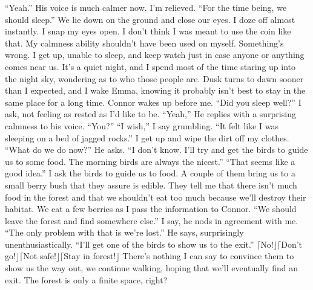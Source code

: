 \documentclass[openany, 12pt]{book}
\newcommand\bird[1]{$\lceil$#1$\rfloor$\tab}
\newcommand\tab[1][1cm]{\hspace*{#1}}
\begin{document}
\newline
\tab
``Yeah.'' His voice is much calmer now. I’m relieved. ``For the time being, we should sleep.'' We lie down on the ground and close our eyes. I doze off almost instantly.
\newline
\newline
\tab
I snap my eyes open. I don’t think I was meant to use the coin like that. My calmness ability shouldn’t have been used on myself. Something’s wrong. I get up, unable to sleep, and keep watch just in case anyone or anything comes near us. It’s a quiet night, and I spend most of the time staring up into the night sky, wondering as to who those people are. Dusk turns to dawn sooner than I expected, and I wake Emma, knowing it probably isn’t best to stay in the same place for a long time.
\newline
\newline
\tab
Connor wakes up before me. ``Did you sleep well?'' I ask, not feeling as rested as I’d like to be.
\newline
\tab
``Yeah,'' He replies with a surprising calmness to his voice. ``You?''
\newline
\tab
``I wish,'' I say grumbling. ``It felt like I was sleeping on a bed of jagged rocks.'' I get up and wipe the dirt off my clothes.
\newline
\tab
``What do we do now?'' He asks.
\newline
\tab
``I don’t know. I’ll try and get the birds to guide us to some food. The morning birds are always the nicest.''
\newline
\tab
``That seems like a good idea.''
\newline
\tab
I ask the birds to guide us to food. A couple of them bring us to a small berry bush that they assure is edible. They tell me that there isn’t much food in the forest and that we shouldn’t eat too much because we’ll destroy their habitat. We eat a few berries as I pass the information to Connor. ``We should leave the forest and find somewhere else.'' I say, he nods in agreement with me.
\newline
\tab
``The only problem with that is we’re lost.'' He says, surprisingly unenthusiastically.
\newline
\tab
``I’ll get one of the birds to show us to the exit.''
\newline
\bird{No!}\bird{Don't go!}\bird{Not safe!}\bird{Stay in forest!}
\newline
\tab
There’s nothing I can say to convince them to show us the way out, we continue walking, hoping that we’ll eventually find an exit. The forest is only a finite space, right?
\end{document}
